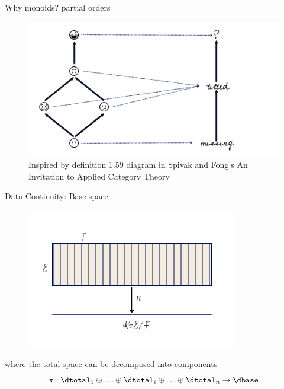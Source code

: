 \documentclass[xcolor={dvipsnames}, handout]{beamer}
\begin{document}
\begin{frame}{Why monoids? partial orders}
\begin{figure}
\begin{overprint}
            \includegraphics[width=1\linewidth]{figures/math/monoid_maps.png}
        \end{overprint}
    \caption{Inspired by definition 1.59 diagram in Spivak and Fong's An Invitation to Applied Category Theory \cite{fongInvitationAppliedCategory2019}}
    \end{figure}
\end{frame}

\begin{frame}{Data Continuity: Base space}
    \begin{figure}[H]
    \includegraphics[height=.5\textheight]{figures/math/k_qspace.png}
    \label{fig:base_space_div}
\end{figure}
where the total space can be decomposed into components 
\begin{equation}
    \pi:\dtotal_1\oplus\ldots\oplus \dtotal_i \oplus\ldots \oplus \dtotal_n \rightarrow \dbase
\end{equation}
\end{frame}
\end{document}
